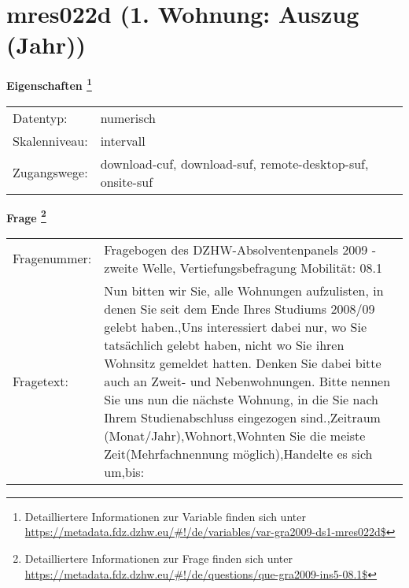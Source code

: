 
    \setcounter{footnote}{0}

    \vspace*{-1.8cm}
	\section{mres022d (1. Wohnung: Auszug (Jahr))}
	\label{section:mres022d}



    \vspace*{0.5cm}
    \noindent\textbf{Eigenschaften
	\footnote{Detailliertere Informationen zur Variable finden sich unter
		\url{https://metadata.fdz.dzhw.eu/\#!/de/variables/var-gra2009-ds1-mres022d$}}}\\
	\begin{tabularx}{\hsize}{@{}lX}
	Datentyp: & numerisch \\
	Skalenniveau: & intervall \\
	Zugangswege: &
	  download-cuf, 
	  download-suf, 
	  remote-desktop-suf, 
	  onsite-suf
 \\
    \end{tabularx}



				\vspace*{0.5cm}
                \noindent\textbf{Frage
	                \footnote{Detailliertere Informationen zur Frage finden sich unter
		              \url{https://metadata.fdz.dzhw.eu/\#!/de/questions/que-gra2009-ins5-08.1$}}}\\
				\begin{tabularx}{\hsize}{@{}lX}
					Fragenummer: &
					  Fragebogen des DZHW-Absolventenpanels 2009 - zweite Welle, Vertiefungsbefragung Mobilität:
					  08.1
 \\
					Fragetext: & Nun bitten wir Sie, alle Wohnungen aufzulisten, in denen Sie seit dem Ende Ihres Studiums 2008/09 gelebt haben.,Uns interessiert dabei nur, wo Sie tatsächlich gelebt haben, nicht wo Sie ihren Wohnsitz gemeldet hatten. Denken Sie dabei bitte auch an Zweit- und Nebenwohnungen. Bitte nennen Sie uns nun die nächste Wohnung, in die Sie nach Ihrem Studienabschluss eingezogen sind.,Zeitraum (Monat/Jahr),Wohnort,Wohnten Sie die meiste Zeit(Mehrfachnennung möglich),Handelte es sich um,bis: \\
				\end{tabularx}






